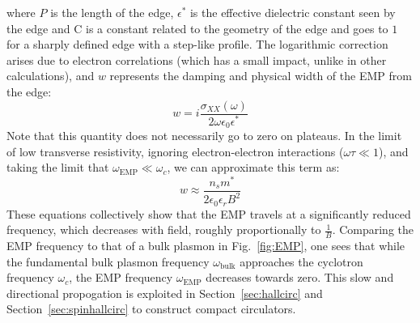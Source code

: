 where $P$ is the length of the edge, $\epsilon^*$ is the effective dielectric constant seen by the edge and C is a constant related to the geometry of the edge and goes
to $1$ for a sharply defined edge with a step-like profile. The logarithmic correction arises due to electron correlations (which has a small impact,
unlike in other calculations), and $w$ represents the damping and physical width of the EMP from the edge:
\begin{equation}
  w = i\frac{\sigma_{XX}(\omega)}{2\omega\epsilon_0\epsilon^*}
\end{equation}
Note that this quantity does not necessarily go to zero on plateaus.
In the limit of low transverse resistivity, ignoring electron-electron interactions ($\omega\tau \ll 1$), and taking the limit
that $\omega_{\textrm{EMP}} \ll \omega_c$, we can approximate this term as:
\begin{equation}
  w \approx \frac{n_sm^*}{2\epsilon_0\epsilon_r B^2}
\end{equation}
These equations collectively show that the EMP travels at a significantly reduced frequency, which decreases with field, roughly proportionally to $\tfrac{1}{B}$.
Comparing the EMP frequency to that of a bulk plasmon in Fig.~\ref{fig:EMP}, one sees that while the fundamental bulk plasmon frequency $\omega_\textrm{bulk}$
approaches the cyclotron frequency $\omega_c$, the EMP frequency $\omega_\textrm{EMP}$ decreases towards zero. This slow and directional propogation is exploited in
Section~\ref{sec:hallcirc} and Section~\ref{sec:spinhallcirc} to construct compact circulators.

